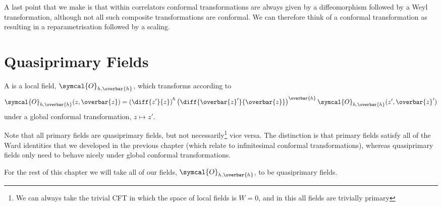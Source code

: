 \documentclass[fleqn]{NotesClass}
\newcommand{\quantumField}[1]{\symcal{#1}}
\begin{document}
    A last point that we make is that within correlators conformal transformations are always given by a diffeomorphism followed by a Weyl transformation, although not all such composite transformations are conformal.
    We can therefore think of a conformal transformation as resulting in a reparametrisation followed by a scaling.
    
    \section{Quasiprimary Fields}
    \begin{dfn}{}{}
        A  is a local field, \(\quantumField{O}_{h,\overbar{h}}\), which transforms according to
        \begin{equation}
            \quantumField{O}_{h,\overbar{h}}(z, \overbar{z}) = \left( \diff{z'}{z} \right)^h \left( \diff{\overbar{z}'}{\overbar{z}} \right)^{\overbar{h}} \quantumField{O}_{h,\overbar{h}}(z', \overbar{z}')
        \end{equation}
        under a global conformal transformation, \(z \mapsto z'\).
    \end{dfn}
    
    Note that all primary fields are quasiprimary fields, but not necessarily\footnote{We can always take the trivial CFT in which the space of local fields is \(W = 0\), and in this all fields are trivially primary} vice versa.
    The distinction is that primary fields satisfy all of the Ward identities that we developed in the previous chapter (which relate to infinitesimal conformal transformations), whereas quasiprimary fields only need to behave nicely under global conformal transformations.
    
    For the rest of this chapter we will take all of our fields, \(\quantumField{O}_{h,\overbar{h}}\), to be quasiprimary fields.
    
\end{document}
